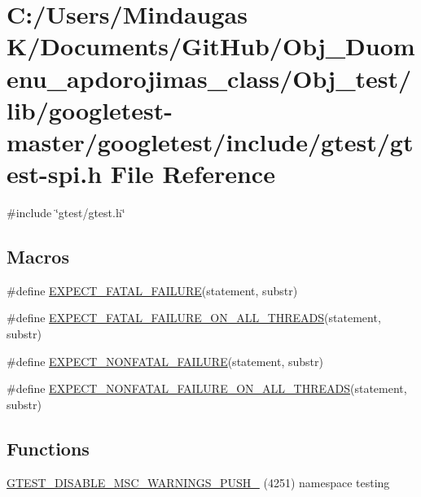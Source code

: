 \hypertarget{_obj__test_2lib_2googletest-master_2googletest_2include_2gtest_2gtest-spi_8h}{}\section{C\+:/\+Users/\+Mindaugas K/\+Documents/\+Git\+Hub/\+Obj\+\_\+\+Duomenu\+\_\+apdorojimas\+\_\+class/\+Obj\+\_\+test/lib/googletest-\/master/googletest/include/gtest/gtest-\/spi.h File Reference}
\label{_obj__test_2lib_2googletest-master_2googletest_2include_2gtest_2gtest-spi_8h}
{\ttfamily \#include \char`\"{}gtest/gtest.\+h\char`\"{}}\newline
\subsection*{Macros}
\begin{DoxyCompactItemize}
\item 
\#define \mbox{\hyperlink{_obj__test_2lib_2googletest-master_2googletest_2include_2gtest_2gtest-spi_8h_a819a3fd7f8b8cf24b6f1b3a26708973d}{E\+X\+P\+E\+C\+T\+\_\+\+F\+A\+T\+A\+L\+\_\+\+F\+A\+I\+L\+U\+RE}}(statement,  substr)
\item 
\#define \mbox{\hyperlink{_obj__test_2lib_2googletest-master_2googletest_2include_2gtest_2gtest-spi_8h_ad8aac5bc859b2ddc07583636ae4f45cf}{E\+X\+P\+E\+C\+T\+\_\+\+F\+A\+T\+A\+L\+\_\+\+F\+A\+I\+L\+U\+R\+E\+\_\+\+O\+N\+\_\+\+A\+L\+L\+\_\+\+T\+H\+R\+E\+A\+DS}}(statement,  substr)
\item 
\#define \mbox{\hyperlink{_obj__test_2lib_2googletest-master_2googletest_2include_2gtest_2gtest-spi_8h_a8376fd6821bd88fd806697355e79e138}{E\+X\+P\+E\+C\+T\+\_\+\+N\+O\+N\+F\+A\+T\+A\+L\+\_\+\+F\+A\+I\+L\+U\+RE}}(statement,  substr)
\item 
\#define \mbox{\hyperlink{_obj__test_2lib_2googletest-master_2googletest_2include_2gtest_2gtest-spi_8h_a9f4cf1f150fe9facfc4cbf0bae646ee9}{E\+X\+P\+E\+C\+T\+\_\+\+N\+O\+N\+F\+A\+T\+A\+L\+\_\+\+F\+A\+I\+L\+U\+R\+E\+\_\+\+O\+N\+\_\+\+A\+L\+L\+\_\+\+T\+H\+R\+E\+A\+DS}}(statement,  substr)
\end{DoxyCompactItemize}
\subsection*{Functions}
\begin{DoxyCompactItemize}
\item 
\mbox{\hyperlink{_obj__test_2lib_2googletest-master_2googletest_2include_2gtest_2gtest-spi_8h_a88f79832f9d045112a76e9da8611cc13}{G\+T\+E\+S\+T\+\_\+\+D\+I\+S\+A\+B\+L\+E\+\_\+\+M\+S\+C\+\_\+\+W\+A\+R\+N\+I\+N\+G\+S\+\_\+\+P\+U\+S\+H\+\_\+}} (4251) namespace testing
\end{DoxyCompactItemize}


